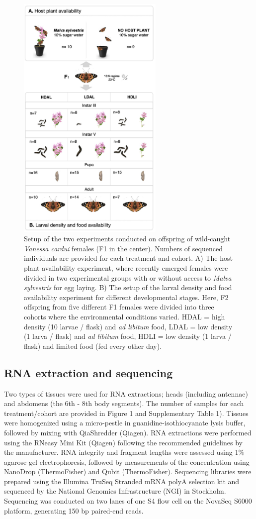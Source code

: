 \documentclass[lineno]{wiley-article}
\begin{document}
\begin{figure}[t]
\centering
\includegraphics[width=7.0cm]{‎Vanessa_RNAseq_Figures2_Fig1.‎001.jpeg}
\caption{Setup of the two experiments conducted on offspring of wild-caught \textit{Vanessa cardui} females (F1 in the center). Numbers of sequenced individuals are provided for each treatment and cohort. A) The host plant availability experiment, where recently emerged females were divided in two experimental groups with or without access to \textit{Malva sylvestris} for egg laying. B) The setup of the larval density and food availability experiment for different developmental stages. Here, F2 offspring from five different F1 females were divided into three cohorts where the environmental conditions varied. HDAL = high density (10 larvae / flask) and \textit{ad libitum} food, LDAL = low density (1 larva / flask) and \textit{ad libitum} food, HDLI = low density (1 larva / flask) and limited food (fed every other day).}
\end{figure}

\subsection{RNA extraction and sequencing}
Two types of tissues were used for RNA extractions; heads (including antennae) and abdomens (the 6th - 8th body segments). The number of samples for each treatment/cohort are provided in Figure 1 and Supplementary Table 1). Tissues were homogenized using a micro-pestle in guanidine-isothiocyanate lysis buffer, followed by mixing with QiaShredder (Qiagen). RNA extractions were performed using the RNeasy Mini Kit (Qiagen) following the recommended guidelines by the manufacturer. RNA integrity and fragment lengths were assessed using 1\% agarose gel electrophoresis, followed by measurements of the concentration using NanoDrop (ThermoFisher) and Qubit (ThermoFisher). Sequencing libraries were prepared using the Illumina TruSeq Stranded mRNA polyA selection kit and sequenced by the National Genomics Infrastructure (NGI) in Stockholm. Sequencing was conducted on two lanes of one S4 flow cell on the NovaSeq S6000 platform, generating 150 bp paired-end reads.
\end{document}
